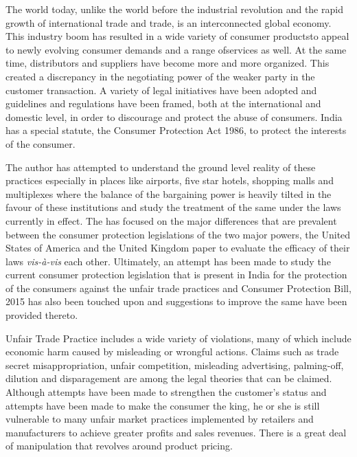 \setcounter{figure}{0}
\setcounter{table}{0}


\begin{multicols}{2}


\noi
The world today, unlike the world before the industrial revolution and the rapid growth of
international trade and trade, is an interconnected global economy. This industry boom has
resulted in a wide variety of consumer productsto appeal to newly evolving consumer demands
and a range ofservices as well. At the same time, distributors and suppliers have become more
and more organized. This created a discrepancy in the negotiating power of the weaker party
in the customer transaction. A variety of legal initiatives have been adopted and guidelines and
regulations have been framed, both at the international and domestic level, in order to
discourage and protect the abuse of consumers. India has a special statute, the Consumer
Protection Act 1986, to protect the interests of the consumer.

\noi
The author has attempted to understand the ground level reality of these practices especially in
places like airports, five star hotels, shopping malls and multiplexes where the balance of the
bargaining power is heavily tilted in the favour of these institutions and study the treatment of
the same under the laws currently in effect. The has focused on the major differences that are
prevalent between the consumer protection legislations of the two major powers, the United
States of America and the United Kingdom paper to evaluate the efficacy of their laws \textit{vis-à-vis} each other. Ultimately, an attempt has been made to study the current consumer protection
legislation that is present in India for the protection of the consumers against the unfair trade
practices and Consumer Protection Bill, 2015 has also been touched upon and suggestions to
improve the same have been provided thereto.

\noi
Unfair Trade Practice includes a wide variety of violations, many of which include economic
harm caused by misleading or wrongful actions. Claims such as trade secret misappropriation,
unfair competition, misleading advertising, palming-off, dilution and disparagement are among
the legal theories that can be claimed. Although attempts have been made to strengthen the
customer's status and attempts have been made to make the consumer the king, he or she is still
vulnerable to many unfair market practices implemented by retailers and manufacturers to achieve greater profits and sales revenues. There is a great deal of manipulation that revolves
around product pricing.


\end{multicols}

